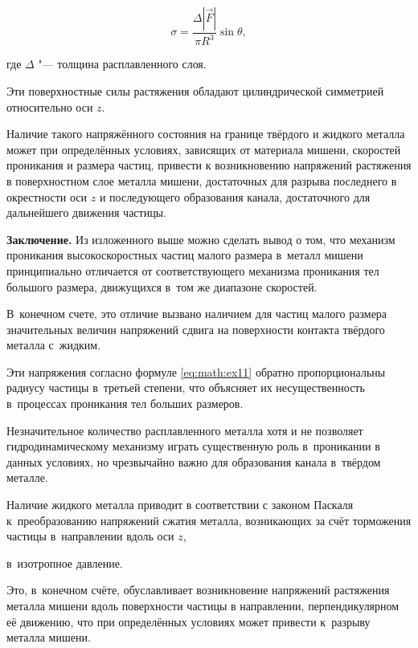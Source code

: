  \begin{equation}

\sigma=\frac{\Delta|\overrightarrow{F}|}{\pi R^{3}}\sin{\theta},

  \label{eq:math:ex11}

\end{equation}

где $\Delta $ "--- толщина расплавленного слоя. 

Эти поверхностные силы растяжения обладают цилиндрической симметрией относительно оси $z $. 

Наличие такого напряжённого состояния на границе твёрдого и жидкого металла может при определённых условиях, зависящих от материала мишени, скоростей проникания и размера частиц, привести к возникновению напряжений растяжения в поверхностном слое металла мишени, достаточных для разрыва последнего в окрестности оси $z $  и последующего образования канала, достаточного для дальнейшего движения частицы.



\smallskip

	

\textbf{Заключение.}	Из изложенного выше можно сделать вывод о том, что механизм проникания высокоскоростных частиц малого размера в~металл мишени принципиально отличается от соответствующего механизма проникания тел большого размера, движущихся в~том же диапазоне скоростей. 

В~конечном счете, это отличие вызвано наличием для частиц малого размера значительных величин напряжений сдвига на поверхности контакта твёрдого металла с~жидким. 

Эти напряжения согласно формуле \eqref{eq:math:ex11} обратно пропорциональны радиусу частицы в~третьей степени, что объясняет их несущественность в~процессах проникания тел больших размеров. 

Незначительное количество расплавленного металла хотя и не позволяет гидродинамическому механизму играть существенную роль в~проникании в данных условиях, но чрезвычайно важно  для образования канала в~твёрдом металле. 

Наличие жидкого металла приводит в соответствии с законом Паскаля к~преобразованию напряжений сжатия металла, возникающих за счёт торможения частицы в~направлении вдоль оси $z $, 

в~изотропное давление. 

Это, в~конечном счёте, обуславливает возникновение напряжений растяжения металла мишени вдоль поверхности частицы в направлении, перпендикулярном её движению, что при определённых условиях может привести к~разрыву металла мишени.








